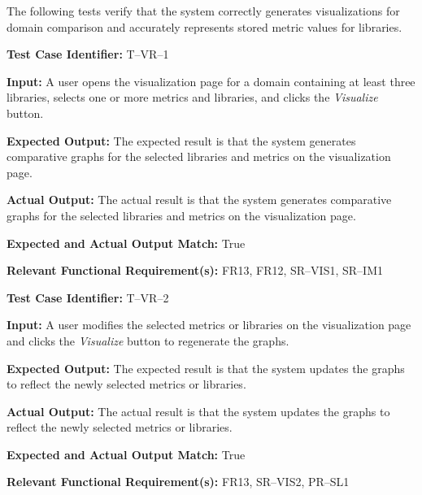 \documentclass[12pt, titlepage]{article}
\begin{document}
\hspace{2em}The following tests verify that the system correctly generates
visualizations for domain comparison and accurately represents stored
metric values for libraries.

\begin{mdframed}[linewidth=0.5mm]
\setlength{\parindent}{0pt}
\textbf{Test Case Identifier:} T--VR--1
\vspace{0.4em}

\textbf{Input:} A user opens the visualization page for a domain containing at least three libraries, selects one or more metrics and libraries, and clicks the \textit{Visualize} button.
\vspace{0.4em}

\textbf{Expected Output:} The expected result is that the system generates comparative graphs for the selected libraries and metrics on the visualization page.
\vspace{0.4em}

\textbf{Actual Output:} The actual result is that the system generates comparative graphs for the selected libraries and metrics on the visualization page.
\vspace{0.4em}

\textbf{Expected and Actual Output Match:} True
\vspace{0.4em}

\textbf{Relevant Functional Requirement(s):} FR13, FR12, SR--VIS1, SR--IM1
\end{mdframed}

\begin{mdframed}[linewidth=0.5mm]
\setlength{\parindent}{0pt}
\textbf{Test Case Identifier:} T--VR--2
\vspace{0.4em}

\textbf{Input:} A user modifies the selected metrics or libraries on the visualization page and clicks the \textit{Visualize} button to regenerate the graphs.
\vspace{0.4em}

\textbf{Expected Output:} The expected result is that the system updates the graphs to reflect the newly selected metrics or libraries.
\vspace{0.4em}

\textbf{Actual Output:} The actual result is that the system updates the graphs to reflect the newly selected metrics or libraries.
\vspace{0.4em}

\textbf{Expected and Actual Output Match:} True
\vspace{0.4em}

\textbf{Relevant Functional Requirement(s):} FR13, SR--VIS2, PR--SL1
\end{mdframed}
\end{document}
